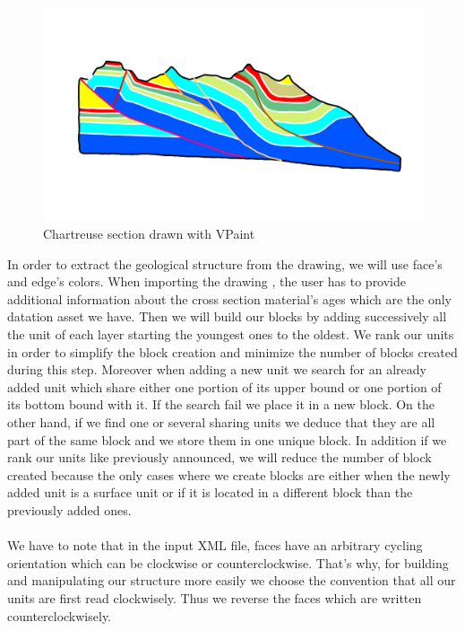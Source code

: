 \documentclass[12pt, a4paper]{report} %
\begin{document}

 \begin{figure}[H]
	\centering
	\includegraphics[scale=0.5]{chartreusevpaint.png}
	\caption{Chartreuse section drawn with VPaint}
	\label{chartreusevpaint}
\end{figure}
In order to extract the geological structure from the drawing, we will use face's and edge's colors. When importing the drawing , the user has to provide additional information about the cross section material's ages which are the only datation asset we have. Then we will build our blocks by adding successively all the unit of each layer starting the youngest ones to the oldest. We rank our units in order to simplify the block creation and minimize the number of blocks created during this step. Moreover when adding a new unit we search for an already added unit which share either one portion of its upper bound  or one portion of its bottom bound with it. If the search fail we place it in a new block. On the other hand, if we find one or several sharing units we deduce that they are all part of the same block and we store them in one unique block. In addition if we rank our units like previously announced, we will reduce the number of block created because the only cases where we create blocks are either when the newly added unit is a surface unit or if it is located in a different block than the previously added ones.\\\\
We have to note that in the input XML file, faces have an arbitrary cycling orientation which can be clockwise or counterclockwise. 
That's why, for building and manipulating our structure more easily we choose the convention that all our units are first read clockwisely. Thus we reverse the faces which are written counterclockwisely.\\\\ 
\end{document}
